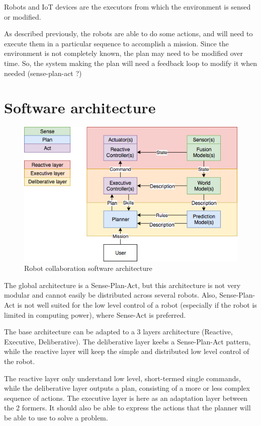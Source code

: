 \documentclass[conference]{IEEEtran}
\begin{document}
Robots and IoT devices are the executors from which the environment is sensed or modified.

As described previously, the robots are able to do some actions, and will need to execute them in a particular sequence to accomplish a mission.
Since the environment is not completely known, the plan may need to be modified over time.
So, the system making the plan will need a feedback loop to modify it when needed (sense-plan-act ?)

\section{Software architecture}

\begin{figure}
  \centering
  \caption{\label{3layers}Robot collaboration software architecture}
  \includegraphics[scale=0.40]{img/3layers}
\end{figure}

The global architecture is a Sense-Plan-Act, but this architecture is not very modular and cannot easily be distributed across several robots.
Also, Sense-Plan-Act is not well suited for the low level control of a robot (especially if the robot is limited in computing power), where Sense-Act is preferred.

The base architecture can be adapted to a 3 layers architecture (Reactive, Executive, Deliberative).
The deliberative layer keebs a Sense-Plan-Act pattern, while the reactive layer will keep the simple and distributed low level control of the robot.

The reactive layer only understand low level, short-termed single commands, while the deliberative layer outputs a plan, consisting of a more or less complex sequence of actions.
The executive layer is here as an adaptation layer between the 2 formers.
It should also be able to express the actions that the planner will be able to use to solve a problem.
\end{document}
